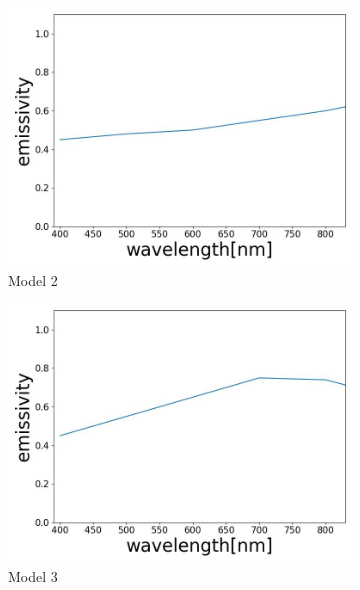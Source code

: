 \begin{figure}[htbp]
    \begin{subfigure}{0.3\linewidth}
      \centering
      \includegraphics[width=\linewidth]{figures/emissivity_22.jpg}
      \caption{Model 2}
      \label{fig: emi_22}
    \end{subfigure}
    \hfill
    \begin{subfigure}{0.3\linewidth}
      \centering
      \includegraphics[width=\linewidth]{figures/emissivity_23.jpg}
      \caption{Model 3}
      \label{fig: emi_23}
    \end{subfigure}
    \hfill
    \begin{subfigure}{0.3\linewidth}
      \centering

\end{subfigure}
\end{figure}
